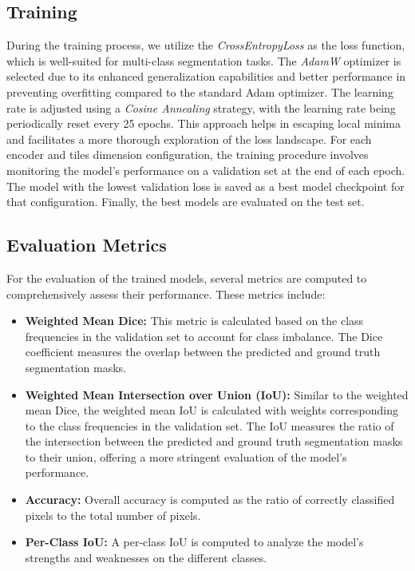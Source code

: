 \documentclass[a4paper]{article}
\begin{document}
\subsection{Training}
During the training process, we utilize the \textit{CrossEntropyLoss} as the loss function, which is well-suited for multi-class segmentation tasks. The \textit{AdamW} optimizer is selected due to its enhanced generalization capabilities and better performance in preventing overfitting compared to the standard Adam optimizer. The learning rate is adjusted using a \textit{Cosine Annealing} strategy, with the learning rate being periodically reset every 25 epochs. This approach helps in escaping local minima and facilitates a more thorough exploration of the loss landscape. For each encoder and tiles dimension configuration, the training procedure involves monitoring the model's performance on a validation set at the end of each epoch. The model with the lowest validation loss is saved as a best model checkpoint for that configuration. Finally, the best models are evaluated on the test set. 

\subsection{Evaluation Metrics}
For the evaluation of the trained models, several metrics are computed to comprehensively assess their performance. These metrics include:
\begin{itemize}
    \item \textbf{Weighted Mean Dice:} This metric is calculated based on the class frequencies in the validation set to account for class imbalance. The Dice coefficient measures the overlap between the predicted and ground truth segmentation masks.

    \item \textbf{Weighted Mean Intersection over Union (IoU):} Similar to the weighted mean Dice, the weighted mean IoU is calculated with weights corresponding to the class frequencies in the validation set. The IoU measures the ratio of the intersection between the predicted and ground truth segmentation masks to their union, offering a more stringent evaluation of the model's performance.

    \item \textbf{Accuracy:} Overall accuracy is computed as the ratio of correctly classified pixels to the total number of pixels.

    \item \textbf{Per-Class IoU:} A per-class IoU is computed to analyze the model's strengths and weaknesses on the different classes.
\end{itemize}
\end{document}
